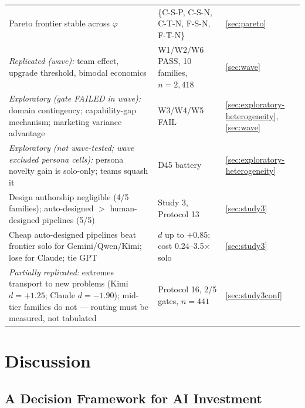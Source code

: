 \documentclass[12pt,a4paper]{article}
\newcommand{\phiBlend}{\varphi}
\begin{document}
\begin{table}[ht]
\begin{tabular}{@{}>{\raggedright\arraybackslash}p{7.6cm} >{\raggedright\arraybackslash}p{4.6cm} >{\raggedright\arraybackslash}p{2.2cm}@{}}
    Pareto frontier stable across $\phiBlend$ & \{C-S-P, C-S-N, C-T-N, F-S-N, F-T-N\} & \cref{sec:pareto} \\
    \emph{Replicated (wave):} team effect, upgrade threshold, bimodal economics & W1/W2/W6 PASS, 10 families, $n = 2{,}418$ & \cref{sec:wave} \\
    \emph{Exploratory (gate FAILED in wave):} domain contingency; capability-gap mechanism; marketing variance advantage & W3/W4/W5 FAIL & \cref{sec:exploratory-heterogeneity}, \cref{sec:wave} \\
    \emph{Exploratory (not wave-tested; wave excluded persona cells):} persona novelty gain is solo-only; teams squash it & D45 battery & \cref{sec:exploratory-heterogeneity} \\
    Design authorship negligible (4/5 families); auto-designed $>$ human-designed pipelines (5/5) & Study 3, Protocol 13 & \cref{sec:study3} \\
    Cheap auto-designed pipelines beat frontier solo for Gemini/Qwen/Kimi; lose for Claude; tie GPT & $d$ up to $+0.85$; cost 0.24--3.5$\times$ solo & \cref{sec:study3} \\
    \emph{Partially replicated:} extremes transport to new problems (Kimi $d = +1.25$; Claude $d = -1.90$); mid-tier families do not --- routing must be measured, not tabulated & Protocol 16, 2/5 gates, $n = 441$ & \cref{sec:study3conf} \\
    \bottomrule
  \end{tabular}
\end{table}

\section{Discussion}\label{sec:discussion}

\subsection{A Decision Framework for AI Investment}\label{sec:decision-framework}
\end{document}
